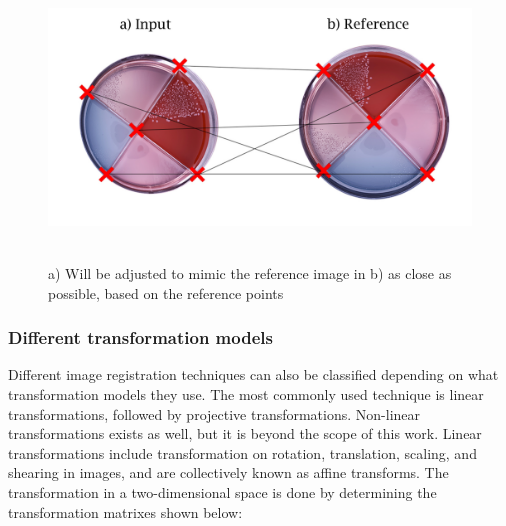 \begin{figure}[htbp]
    \centering
     \includegraphics[width=0.8\linewidth]{figures/PDF/Image_reg_theory.pdf}\\\\
    \caption{a) Will be adjusted to mimic the reference image in b) as close as possible, based on the reference points}
    \label{fig:image reg}
\end{figure}

\subsubsection{Different transformation models}
Different image registration techniques \cite{Nag} can also be classified depending on what transformation models they use. The most commonly used technique is linear transformations, followed by projective transformations. Non-linear transformations exists as well, but it is beyond the scope of this work. Linear transformations include transformation on rotation, translation, scaling, and shearing in images, and are collectively known as affine transforms. The transformation in a two-dimensional space is done by determining the transformation matrixes shown below: \\

